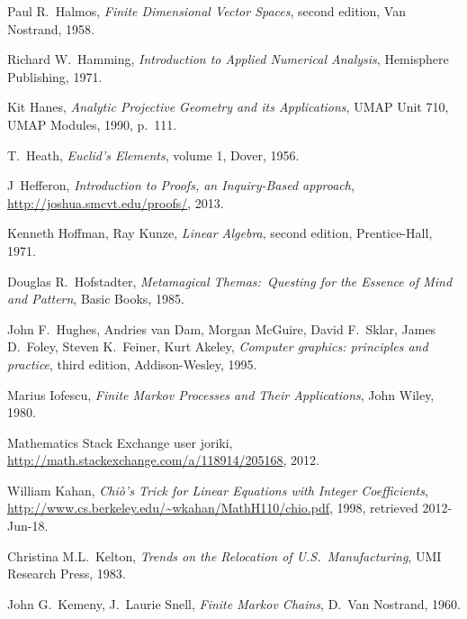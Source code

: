 \begin{thebibliography}{\makebox[2em][c]{{}\hfil{}}}
  Paul R.~Halmos,
  \emph{Finite Dimensional Vector Spaces},
  second edition,
  Van Nostrand,
  1958.


  Richard W.\ Hamming,
  \emph{Introduction to Applied Numerical Analysis},
  Hemisphere Publishing,
  1971.

  Kit Hanes,
  \emph{Analytic Projective Geometry and its Applications},
  UMAP Unit 710,
  UMAP Modules, 1990,
  p.~111.

  T.\ Heath,
  \emph{Euclid's Elements},
  volume 1,
  Dover,
  1956.

  J~Hef{}feron,
  \emph{Introduction to Proofs, an Inquiry-Based approach},
  \url{http://joshua.smcvt.edu/proofs/},
  2013.

  Kenneth Hoffman, Ray Kunze,
  \emph{Linear Algebra},
  second edition,
  Prentice-Hall,
  1971.

 Douglas R.~Hofstadter,
 \emph{Metamagical Themas:~Questing for the Essence of Mind and Pattern},
 Basic Books,
 1985.

  John F.\ Hughes, Andries van Dam, Morgan McGuire,
  David F.\ Sklar, James D.\ Foley, Steven K.\ Feiner, Kurt Akeley,
  \emph{Computer graphics: principles and practice},
  third edition,
  Addison-Wesley,
  1995.

  Marius Iofescu,
  \emph{Finite Markov Processes and Their Applications},
  John Wiley, 1980.

  Mathematics Stack Exchange user joriki,
  \url{http://math.stackexchange.com/a/118914/205168},
  2012.

  William Kahan,
  \emph{Chi\`{o}'s Trick  for  Linear Equations  with  Integer Coefficients},
  \url{http://www.cs.berkeley.edu/~wkahan/MathH110/chio.pdf}, 1998,
  retrieved 2012-Jun-18.

  Christina M.L.~Kelton,
  \emph{Trends on the Relocation of U.S.\ Manufacturing},
  UMI Research Press, 1983.

  John G.~Kemeny, J.~Laurie Snell,
  \emph{Finite Markov Chains},
  D.~Van Nostrand, 1960.


\end{thebibliography}
